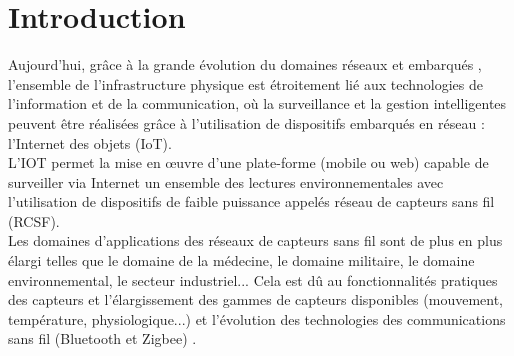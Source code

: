 \chapter*{Introduction}
\label{chap:introduction}

 	Aujourd'hui, grâce à la grande évolution du domaines réseaux et embarqués , l'ensemble de l'infrastructure physique est étroitement lié aux technologies de l’information et de la communication, où la surveillance et la gestion intelligentes peuvent être réalisées grâce à l'utilisation de dispositifs embarqués en réseau : l'Internet des objets (IoT).\\ [1cm]
 	
 	L'IOT permet la mise en œuvre d'une plate-forme (mobile ou web) capable de surveiller via Internet
un ensemble des lectures environnementales avec l'utilisation de dispositifs de faible puissance appelés réseau de capteurs sans fil (RCSF).\\ [1cm]
    
    
    Les domaines d’applications des réseaux de capteurs sans fil sont de plus en plus élargi  telles que le domaine de la médecine, le domaine militaire, le domaine environnemental, le secteur industriel... Cela est dû au fonctionnalités pratiques des capteurs et l’élargissement des gammes de capteurs disponibles (mouvement, température, physiologique...)
et l’évolution des technologies des communications sans fil (Bluetooth et Zigbee) .


